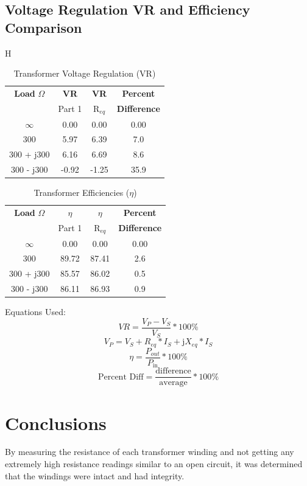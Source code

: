 \documentclass{article}
\begin{document}
\subsection{Voltage Regulation VR and Efficiency Comparison}
\begin{table}{H}
  \centering
  \begin{tabular}{*{4}{c}}
    \textbf{Load} $\Omega$ & \textbf{VR} & \textbf{VR} & \textbf{Percent} \\
    & Part 1 & R$_{eq}$ & \textbf{Difference} \\
    \hline
    $\infty$ & 0.00 & 0.00 & 0.00 \\
    300 & 5.97 & 6.39 & 7.0 \\
    300 + j300 & 6.16 & 6.69 & 8.6 \\
    300 - j300 & -0.92 & -1.25 & 35.9 \\
  \end{tabular}
  \caption{Transformer Voltage Regulation (VR)}
  \label{tab:vr}
\end{table}

\begin{table}[H]
  \centering
  \begin{tabular}{*{4}{c}}
    \textbf{Load} $\Omega$ & $\eta$ & $\eta$ & \textbf{Percent} \\
    & Part 1 & R$_{eq}$ & \textbf{Difference} \\
    \hline
    $\infty$ & 0.00 & 0.00 & 0.00 \\
    300 & 89.72 & 87.41 & 2.6 \\
    300 + j300 & 85.57 & 86.02 & 0.5 \\
    300 - j300 & 86.11 & 86.93 & 0.9 \\
  \end{tabular}
  \caption{Transformer Efficiencies ($\eta$)}
  \label{tab:eff}
\end{table}

Equations Used:
\[VR = \frac{V_P - V_S}{V_S} * 100\%\]
\[V_P = V_S + R_{eq} * I_S + \text{j}X_{eq} * I_S\]
\[\eta = \frac{P_{out}}{P_\text{in}} * 100\% \]
\[\text{Percent Diff} = \frac{\text{difference}}{\text{average}} * 100\%\]

\section{Conclusions}

By measuring the resistance of each transformer winding and not getting any extremely high resistance readings
similar to an open circuit, it was determined that the windings were intact and had integrity.
\end{document}
